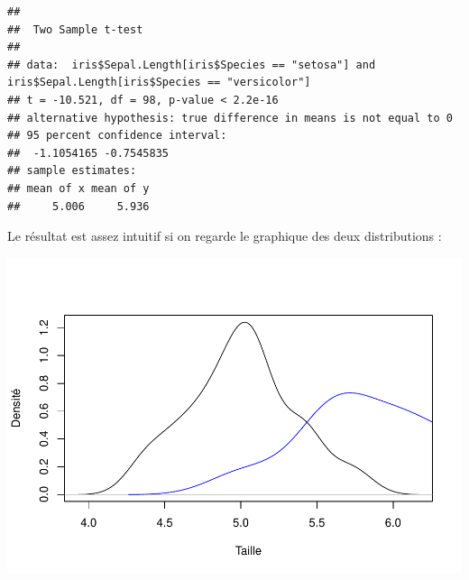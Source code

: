 \documentclass[
]{book}
\newenvironment{Shaded}{\begin{snugshade}}{\end{snugshade}}
\newcommand{\AttributeTok}[1]{\textcolor[rgb]{0.13,0.29,0.53}{#1}}
\newcommand{\FunctionTok}[1]{\textcolor[rgb]{0.13,0.29,0.53}{\textbf{#1}}}
\newcommand{\NormalTok}[1]{#1}
\newcommand{\SpecialCharTok}[1]{\textcolor[rgb]{0.81,0.36,0.00}{\textbf{#1}}}
\newcommand{\StringTok}[1]{\textcolor[rgb]{0.31,0.60,0.02}{#1}}
\begin{document}
\begin{verbatim}
## 
##  Two Sample t-test
## 
## data:  iris$Sepal.Length[iris$Species == "setosa"] and iris$Sepal.Length[iris$Species == "versicolor"]
## t = -10.521, df = 98, p-value < 2.2e-16
## alternative hypothesis: true difference in means is not equal to 0
## 95 percent confidence interval:
##  -1.1054165 -0.7545835
## sample estimates:
## mean of x mean of y 
##     5.006     5.936
\end{verbatim}

Le résultat est assez intuitif si on regarde le graphique des deux distributions :

\begin{Shaded}
\end{Shaded}

\includegraphics{_main_files/figure-latex/test_student1-1.pdf}
\end{document}
